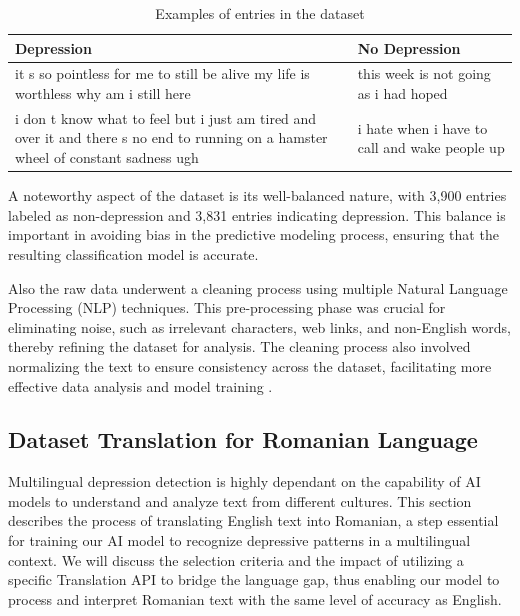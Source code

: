 \begin{table}[ht]
\centering
\renewcommand{\arraystretch}{1.5} %
\begin{adjustbox}{width=\textwidth}
\begin{tabular}{|p{}|p{}|} %
\hline
\textbf{Depression} & \textbf{No Depression} \\ \hline
it s so pointless for me to still be alive my life is worthless why am i still here & this week is not going as i had hoped \\ \hline
i don t know what to feel but i just am tired and over it and there s no end to running on a hamster wheel of constant sadness ugh & i hate when i have to call and wake people up \\ \hline
\end{tabular}
\end{adjustbox}
\caption{Examples of entries in the dataset}
\label{datasetEnglishExamples}
\end{table}


A noteworthy aspect of the dataset is its well-balanced nature, with 3,900 entries labeled as non-depression and 3,831 entries indicating depression. This balance is important in avoiding bias in the predictive modeling process, ensuring that the resulting classification model is accurate.

Also the raw data underwent a cleaning process using multiple Natural Language Processing (NLP) techniques. This pre-processing phase was crucial for eliminating noise, such as irrelevant characters, web links, and non-English words, thereby refining the dataset for analysis. The cleaning process also involved normalizing the text to ensure consistency across the dataset, facilitating more effective data analysis and model training \cite{depressionDataset}.

\subsection{Dataset Translation for Romanian Language}
\par \quad Multilingual depression detection is highly dependant on the capability of AI models to understand and analyze text from different cultures. This section describes the process of translating English text into Romanian, a step essential for training our AI model to recognize depressive patterns in a multilingual context. We will discuss the selection criteria and the impact of utilizing a specific Translation API to bridge the language gap, thus enabling our model to process and interpret Romanian text with the same level of accuracy as English. 

